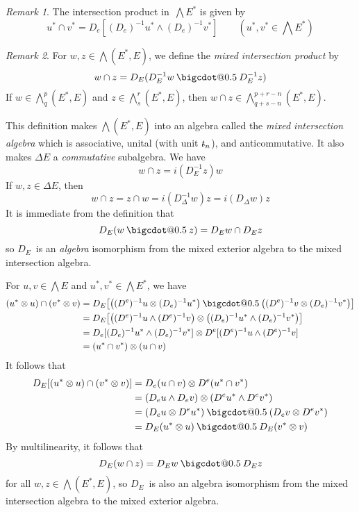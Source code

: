 \documentclass[letterpaper,12pt]{article}
\makeatletter
\newcommand{\bigcdot}[1]{\mathbin{\mathpalette\bigcdot@{#1}}}
\newcommand{\bigcdot@}[2]{%
  \sbox0{$#1\vcenter{}$}%
  \sbox2{$#1\cdot\m@th$}%
  \hbox{%
    \hfil
    \raise\ht0\hbox{%
      \scalebox{#2}{%
        \lower\ht0\hbox{$#1\bullet\m@th$}%
      }%
    }%
    \hfil
  }%
}
\newcommand{\sect}{\cap}
\newcommand{\tprod}{\otimes}
\newcommand{\eprod}{\wedge}
\newcommand{\bigeprod}{\bigwedge}
\newcommand{\medeprod}{{\textstyle\bigeprod}}
\newcommand{\mprod}{\bigcdot{0.5}}
\newcommand{\stroked}[1]{\mathrlap{\text{\kern0.05em-}}#1}
\newcommand{\unit}{\stroked{t}}
\theoremstyle{definition}
\theoremstyle{remark}
\newtheorem*{rmk}{Remark}
\makeatother
\begin{document}
\begin{rmk}
The intersection product in~\(\medeprod E^*\) is given by
\[u^*\sect v^*=D_e[(D_e)^{-1}u^*\eprod(D_e)^{-1}v^*]\qquad(u^*,v^*\in\medeprod E^*)\]
\end{rmk}

\begin{rmk}
For \(w,z\in\medeprod(E^*,E)\), we define the \emph{mixed intersection product} by
\[w\sect z=D_E(D_E^{-1}w\mprod D_E^{-1}z)\]
If \(w\in\medeprod^p_q(E^*,E)\) and \(z\in\medeprod^r_s(E^*,E)\), then \(w\sect z\in\medeprod^{p+r-n}_{q+s-n}(E^*,E)\).

This definition makes \(\medeprod(E^*,E)\) into an algebra called the \emph{mixed intersection algebra} which is associative, unital (with unit \(\unit_n\)), and anticommutative. It also makes \(\Delta E\) a \emph{commutative} subalgebra. We have
\[w\sect z=i(D_E^{-1}z)w\]
If \(w,z\in\Delta E\), then
\[w\sect z=z\sect w=i(D_{\Delta}^{-1}w)z=i(D_{\Delta}w)z\]
It is immediate from the definition that
\[D_E(w\mprod z)=D_Ew\sect D_Ez\]
so \(D_E\)~is an \emph{algebra} isomorphism from the mixed exterior algebra to the mixed intersection algebra.

For \(u,v\in\medeprod E\) and \(u^*,v^*\in\medeprod E^*\), we have
\begin{align*}
(u^*\tprod u)\sect(v^*\tprod v)&=D_E\bigl[\bigl((D^e)^{-1}u\tprod(D_e)^{-1} u^*\bigr)\mprod\bigl((D^e)^{-1}v\tprod(D_e)^{-1}v^*\bigr)\bigr]\\
	&=D_E\bigl[\bigl((D^e)^{-1}u\eprod(D^e)^{-1}v\bigr)\tprod\bigl((D_e)^{-1}u^*\eprod(D_e)^{-1}v^*\bigr)\bigr]\\
	&=D_e[(D_e)^{-1}u^*\eprod(D_e)^{-1}v^*]\tprod D^e[(D^e)^{-1}u\eprod(D^e)^{-1}v]\\
	&=(u^*\sect v^*)\tprod(u\sect v)
\end{align*}
It follows that
\begin{align*}
D_E[(u^*\tprod u)\sect(v^*\tprod v)]&=D_e(u\sect v)\tprod D^e(u^*\sect v^*)\\
	&=(D_eu\eprod D_ev)\tprod(D^eu^*\eprod D^ev^*)\\
	&=(D_eu\tprod D^e u^*)\mprod(D_ev\tprod D^ev^*)\\
	&=D_E(u^*\tprod u)\mprod D_E(v^*\tprod v)
\end{align*}
By multilinearity, it follows that
\[D_E(w\sect z)=D_Ew\mprod D_Ez\]
for all \(w,z\in\medeprod(E^*,E)\), so \(D_E\)~is also an algebra isomorphism from the mixed intersection algebra to the mixed exterior algebra.
\end{rmk}
\end{document}

